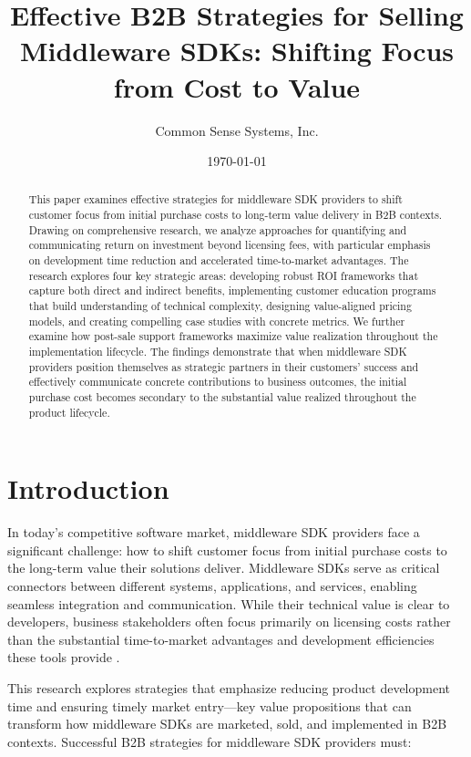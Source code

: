 \documentclass[11pt,a4paper]{article}
\title{\LARGE\textbf{Effective B2B Strategies for Selling Middleware SDKs: Shifting Focus from Cost to Value}}
\author{Common Sense Systems, Inc.}
\date{\today}
\begin{document}
\maketitle
\thispagestyle{fancy}

\begin{abstract}
This paper examines effective strategies for middleware SDK providers to shift customer focus from initial purchase costs to long-term value delivery in B2B contexts. Drawing on comprehensive research, we analyze approaches for quantifying and communicating return on investment beyond licensing fees, with particular emphasis on development time reduction and accelerated time-to-market advantages. The research explores four key strategic areas: developing robust ROI frameworks that capture both direct and indirect benefits, implementing customer education programs that build understanding of technical complexity, designing value-aligned pricing models, and creating compelling case studies with concrete metrics. We further examine how post-sale support frameworks maximize value realization throughout the implementation lifecycle. The findings demonstrate that when middleware SDK providers position themselves as strategic partners in their customers' success and effectively communicate concrete contributions to business outcomes, the initial purchase cost becomes secondary to the substantial value realized throughout the product lifecycle.
\end{abstract}

\tableofcontents
\newpage

\section{Introduction}

In today's competitive software market, middleware SDK providers face a significant challenge: how to shift customer focus from initial purchase costs to the long-term value their solutions deliver. Middleware SDKs serve as critical connectors between different systems, applications, and services, enabling seamless integration and communication. While their technical value is clear to developers, business stakeholders often focus primarily on licensing costs rather than the substantial time-to-market advantages and development efficiencies these tools provide \cite{tradecentric2023}.

This research explores strategies that emphasize reducing product development time and ensuring timely market entry—key value propositions that can transform how middleware SDKs are marketed, sold, and implemented in B2B contexts. Successful B2B strategies for middleware SDK providers must:
\end{document}
